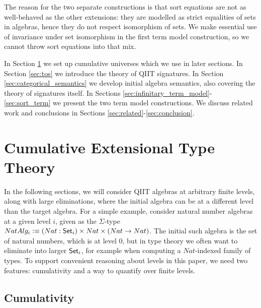\documentclass{llncs}
\begin{document}
The reason for the two separate constructions is that sort equations are not as
well-behaved as the other extensions: they are modelled as strict equalities of
sets in algebras, hence they do not respect isomorphism of sets. We make
essential use of invariance under set isomorphism in the first term model
construction, so we cannot throw sort equations into that mix.

In Section \ref{sec:levels} we set up cumulative universes which we use in later
sections. In Section \ref{sec:tos} we introduce the theory of QIIT
signatures. In Section \ref{sec:categorical_semantics} we develop initial algebra semantics,
also covering the theory of signatures itself. In Sections
\ref{sec:infinitary_term_model}-\ref{sec:sort_term} we present the two term model
constructions. We discuss related work and conclusions in Sections
\ref{sec:related}-\ref{sec:conclusion}.


\section{Cumulative Extensional Type Theory}
\label{sec:levels}

In the following sections, we will consider QIIT algebras at arbitrary finite
levels, along with large eliminations, where the initial algebra can be at a
different level than the target algebra. For a simple example, consider natural
number algebras at a given level $i$, given as the $\Sigma$-type $NatAlg_i
:\equiv(Nat : \mathsf{Set}_i)\times Nat\times(Nat \rightarrow Nat)$. The initial such algebra is
the set of natural numbers, which is at level $0$, but in type theory we often
want to eliminate into larger $\mathsf{Set}_i$, for example when computing a
$Nat$-indexed family of types. To support convenient reasoning about levels in
this paper, we need two features: cumulativity and a way to quantify over finite
levels.


\subsection{Cumulativity}
\end{document}
